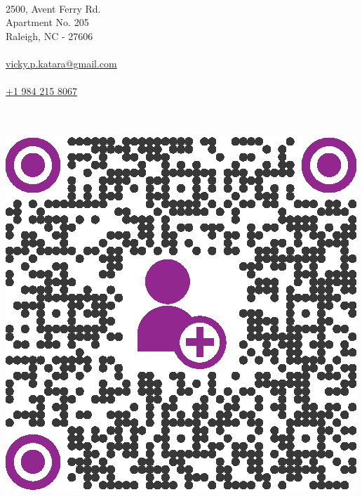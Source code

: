 \documentclass[a4paper,12pt,final]{memoir}
\newcommand{\Sep}{\vspace{1.5em}}
\newcommand{\SmallSep}{\vspace{0.5em}}
\begin{document}

\begin{flushright} 
	\footnotesize
	\SmallSep
	{\bfseries{\color{Plum}{Address}}}\\
	
	2500, Avent Ferry Rd.\\
	Apartment No. 205\\
	Raleigh, NC - 27606\\
	\Sep
	{\bfseries{\color{Plum}{EMail}}}\\
	\href{mailto:vicky.p.katara@gmail.com}{vicky.p.katara@gmail.com}\\
	\Sep
	{\bfseries{\color{Plum}{Cellphone}}}\\
	\href{tel:+19842158067}{+1 984 215 8067}\\
	\Sep
\end{flushright}\normalsize
	\hspace{0.9cm}
		\vspace{-0.35cm}
	\bfseries{\color{Plum}{Save My Contact}}\\\\
	\vspace{-0.1cm}
	\hspace{-0.4cm}
	\includegraphics[width=0.8\columnwidth]{qrcode_2.eps}
\framebreak
\end{document}
